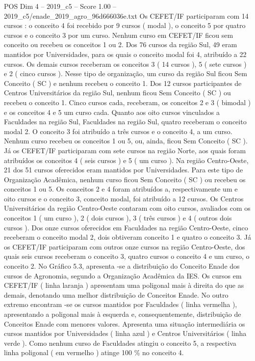 \begin{textsample}{POS Dim 4 – 2019\_c5 – Score 1.00 – 2019\_c5/enade\_2019\_agro\_96d666036e.txt}
Os CEFET/IF participaram com 14 cursos : o conceito 4 foi recebido por 9 cursos ( modal ), o conceito 5 por quatro cursos e o conceito 3 por um curso.
Nenhum curso em CEFET/IF ficou sem conceito ou recebeu os conceitos 1 ou 2.
Dos 76 cursos da região Sul, 49 eram mantidos por Universidades, para os quais o conceito modal foi 4, atribuído a 22 cursos.
Os demais cursos receberam os conceitos 3 ( 14 cursos ), 5 ( sete cursos ) e 2 ( cinco cursos ).
Nesse tipo de organização, um curso da região Sul ficou Sem Conceito ( SC ) e nenhum recebeu o conceito 1.
Dos 12 cursos participantes de Centros Universitários da região Sul, nenhum ficou Sem Conceito ( SC ) ou recebeu o conceito 1.
Cinco cursos cada, receberam, os conceitos 2 e 3 ( bimodal ) e os conceitos 4 e 5 um curso cada.
Quanto aos oito cursos vinculados a Faculdades na região Sul, Faculdades na região Sul, quatro receberam o conceito modal 2.
O conceito 3 foi atribuído a três cursos e o conceito 4, a um curso.
Nenhum curso recebeu os conceitos 1 ou 5, ou, ainda, ficou Sem Conceito ( SC ).
Já os CEFET/IF participaram com sete cursos na região Norte, aos quais foram atribuídos os conceitos 4 ( seis cursos ) e 5 ( um curso ).
Na região Centro-Oeste, 21 dos 51 cursos oferecidos eram mantidos por Universidades.
Para este tipo de Organização Acadêmica, nenhum curso ficou Sem Conceito ( SC ) ou recebeu os conceitos 1 ou 5.
Os conceitos 2 e 4 foram atribuídos a, respectivamente um e oito cursos e o conceito 3, conceito modal, foi atribuído a 12 cursos.
Os Centros Universitários da região Centro-Oeste contaram com oito cursos, avaliados com os conceitos 1 ( um curso ), 2 ( dois cursos ), 3 ( três cursos ) e 4 ( outros dois cursos ).
Dos onze cursos oferecidos em Faculdades na região Centro-Oeste, cinco receberam o conceito modal 2, dois obtiveram conceito 1 e quatro o conceito 3.
Já os CEFET/IF participaram com outros onze cursos na região Centro-Oeste, dos quais seis cursos receberam o conceito 3, quatro cursos o conceito 4 e um curso, o conceito 2.
No Gráfico 5.3, apresenta -se a distribuição do Conceito Enade dos cursos de Agronomia, segundo a Organização Acadêmica da IES.
Os cursos em CEFET/IF ( linha laranja ) apresentam uma poligonal mais à direita do que as demais, denotando uma melhor distribuição de Conceitos Enade.
No outro extremo encontram -se os cursos mantidos por Faculdades ( linha vermelha ), apresentando a poligonal mais à esquerda e, consequentemente, distribuição de Conceitos Enade com menores valores.
Apresenta uma situação intermediária os cursos mantidos por Universidades ( linha azul ) e Centros Universitários ( linha verde ).
Como nenhum curso de Faculdades atingiu o conceito 5, a respectiva linha poligonal ( em vermelho ) atinge 100 \% no conceito 4.

\end{textsample}
